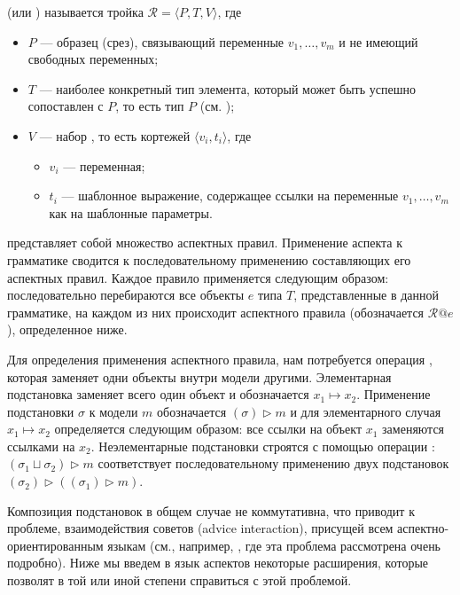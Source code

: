 \begin{Def}
 (или ) называется тройка
$\mathcal{R} = \langle P, T, V \rangle$, где
\begin{itemize}
\item $P$ --- образец (срез), связывающий переменные $v_1,\ldots,v_m$ и не имеющий свободных переменных;
\item $T$ --- наиболее конкретный тип элемента, который может быть успешно сопоставлен с $P$, то есть тип $P$ (см. );
\item $V$ --- набор , то есть кортежей $\langle v_i, t_i \rangle$, где
	\begin{itemize}
		\item $v_i$ --- переменная;
		\item $t_i$ --- шаблонное выражение, содержащее ссылки на переменные $v_1,\ldots,v_m$ как на шаблонные параметры.
	\end{itemize}
\end{itemize}
\end{Def}
\newcommand{\rapply}[2]{#1@#2}
 представляет собой множество аспектных правил. Применение аспекта к грамматике сводится к последовательному применению составляющих его аспектных правил. Каждое правило применяется следующим образом: последовательно перебираются все объекты $e$ типа $T$, представленные в данной грамматике, на каждом из них происходит  аспектного правила (обозначается $\rapply{\mathcal{R}}{e}$), определенное ниже.

\newcommand{\subst}[2]{ #1 \mapsto #2 }
\newcommand{\apply}[2]{\left( #1 \right) \triangleright #2}
Для определения применения аспектного правила, нам потребуется операция , которая заменяет одни объекты внутри модели другими. Элементарная подстановка заменяет всего один объект и обозначается $\subst{x_1}{x_2}$. Применение подстановки $\sigma$ к модели $m$ обозначается $\apply{\sigma}{m}$ и для элементарного случая $\subst{x_1}{x_2}$ определяется следующим образом: все ссылки на объект $x_1$ заменяются ссылками на $x_2$.
Неэлементарные подстановки строятся с помощью операции : $\apply{\sigma_1 \sqcup \sigma_2}{m}$ соответствует последовательному применению двух подстановок $\apply{\sigma_2}{\left( \apply{\sigma_1}{m} \right)}$.

\begin{Note}
Композиция подстановок в общем случае не коммутативна, что приводит к проблеме, взаимодействия советов (advice interaction), присущей всем аспектно-ориентированным языкам (см., например, \cite{JAMI}, где эта проблема рассмотрена очень подробно). Ниже мы введем в язык аспектов некоторые расширения, которые позволят в той или иной степени справиться с этой проблемой.
\end{Note}


